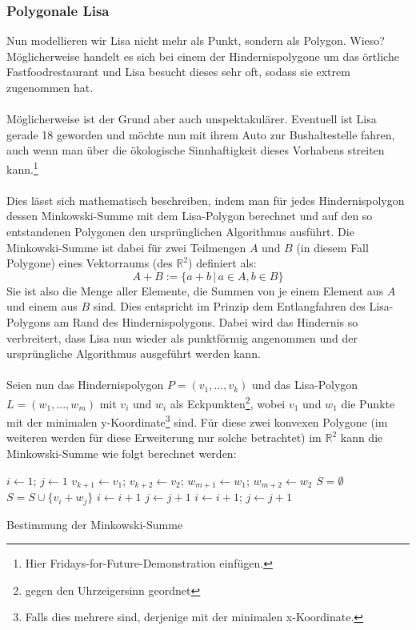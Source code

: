 \documentclass[a4paper, notitlepage, 12pt]{scrartcl}
\begin{document}
  \subsubsection{Polygonale Lisa}
 Nun modellieren wir Lisa nicht mehr als Punkt, sondern als Polygon. Wieso? Möglicherweise handelt es sich bei einem der Hindernispolygone um das örtliche Fastfoodrestaurant und Lisa besucht dieses sehr oft, sodass sie extrem zugenommen hat. \\ \\
 Möglicherweise ist der Grund aber auch unspektakulärer. Eventuell ist Lisa gerade 18 geworden und möchte nun mit ihrem Auto zur Bushaltestelle fahren, auch wenn man über die ökologische Sinnhaftigkeit dieses Vorhabens streiten kann.\footnote{Hier Fridays-for-Future-Demonstration einfügen.} \\ \\
 Dies lässt sich mathematisch beschreiben, indem man für jedes Hindernispolygon dessen Minkowski-Summe mit dem Lisa-Polygon berechnet und auf den so entstandenen Polygonen den ursprünglichen Algorithmus ausführt. Die Minkowski-Summe ist dabei für zwei Teilmengen $A$ und $B$ (in diesem Fall Polygone) eines Vektorraums (des $\mathbb{R}^{2}$) definiert als:
 \begin{equation}
 A + B := \{a+b\,|\,a \in A, b \in B\}
 \end{equation}
 Sie ist also die Menge aller Elemente, die Summen von je einem Element aus $A$ und einem aus $B$ sind.\cite{Src:minkowski} Dies entspricht im Prinzip dem Entlangfahren des Lisa-Polygons am Rand des Hindernispolygons. Dabei wird das Hindernis so verbreitert, dass Lisa nun wieder als punktförmig angenommen und der ursprüngliche Algorithmus ausgeführt werden kann. \\ \\
 Seien nun das Hindernispolygon $P = (v_1,...,v_k)$ und das Lisa-Polygon $L = (w_1,...,w_m)$ mit $v_i$ und $w_i$ als Eckpunkten\footnote{gegen den Uhrzeigersinn geordnet}, wobei $v_1$ und $w_1$ die Punkte mit der minimalen y-Koordinate\footnote{Falls dies mehrere sind, derjenige mit der minimalen x-Koordinate.} sind. Für diese zwei konvexen Polygone (im weiteren werden für diese Erweiterung nur solche betrachtet) im $\mathbb{R}^{2}$ kann die Minkowski-Summe wie folgt berechnet werden:
 \begin{algorithm}[H]
\begin{algorithmic}
	\State $i \gets 1$; $j \gets 1$
	\State $v_{k+1} \gets v_1$; $v_{k+2} \gets v_2$; $w_{m+1} \gets w_1$; $w_{m+2} \gets w_2$
	\State $S = \emptyset$ 
	\Repeat
	\State $S = S \cup \{v_i + w_j\}$
	\State $i \gets i + 1$
	\State $j \gets j + 1$
	\Else
	\State $i \gets i + 1$; $j \gets j + 1$
	\EndIf
	\EndFunction
\end{algorithmic}
\caption{Bestimmung der Minkowski-Summe}
\end{algorithm}
\end{document}
